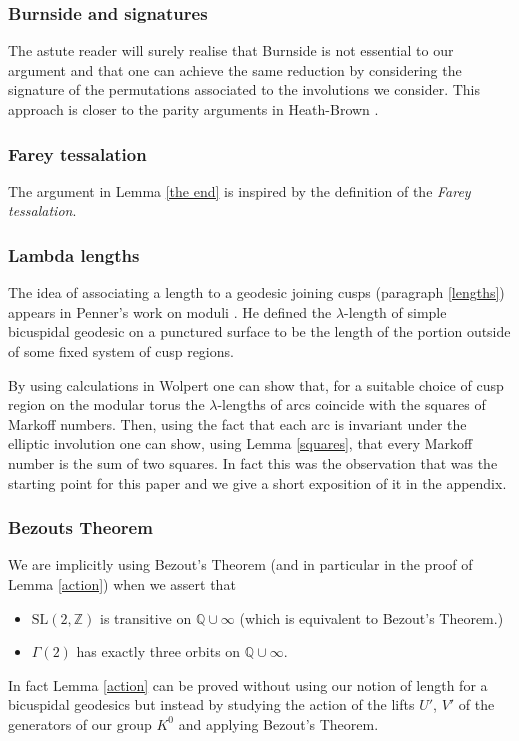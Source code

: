 \documentclass[12pt,a4paper]{amsart}
\def\ZZ{\mathbb{Z}}
\def\QQ{\mathbb{Q}}
\def\sl2{\mathrm{SL}(2, \ZZ)}
\def\g2{\Gamma(2)}
\begin{document}
\subsubsection{Burnside and signatures}
 The astute reader will surely realise that Burnside is not essential to our argument
 and that one can achieve the same reduction by considering the signature
 of the permutations associated to the  involutions we consider. 
 This approach is closer to the parity arguments in Heath-Brown \cite{heath}.
 
 \subsubsection{Farey tessalation}
 The argument in Lemma \ref{the end} is inspired by the definition of the 
 \textit{Farey tessalation}.
 
  \subsubsection{Lambda lengths}
 The idea of associating a length to a geodesic joining cusps
 (paragraph \ref{lengths}) appears in Penner's work on moduli \cite{bob}.
He defined the $\lambda$-length of simple bicuspidal geodesic 
on a punctured
surface to be the length of the portion outside of some fixed
 system of cusp regions.
 
 By using calculations in Wolpert \cite{saw}
 one can show that, for a suitable choice of cusp region 
 on the modular torus  the $\lambda$-lengths of arcs 
 coincide with the squares of Markoff numbers. 
 Then, using the fact that each arc is invariant under the 
 elliptic involution one can show, 
using Lemma \ref{squares},
 that every Markoff number is the sum of two squares.
 In fact this was the observation that was the starting point for this paper
 and we give a short exposition of it  in the appendix.
 
 
 \subsubsection{Bezouts Theorem}
 We are implicitly using  Bezout's Theorem
 (and in particular in the proof of Lemma \ref{action})
 when we assert that
 \begin{itemize}
 \item $\sl2$ is transitive on $\QQ \cup \infty$ (which is equivalent to Bezout's Theorem.)
 \item $\g2$ has exactly three orbits on $\QQ \cup \infty$.
 \end{itemize}
In fact Lemma \ref{action} can be proved
 without using our notion of length for a bicuspidal geodesics 
 but  instead by studying the action of 
 the lifts $U'$, $V'$  of the generators of our group $K^0$  
 and applying Bezout's Theorem.
 
\end{document}
